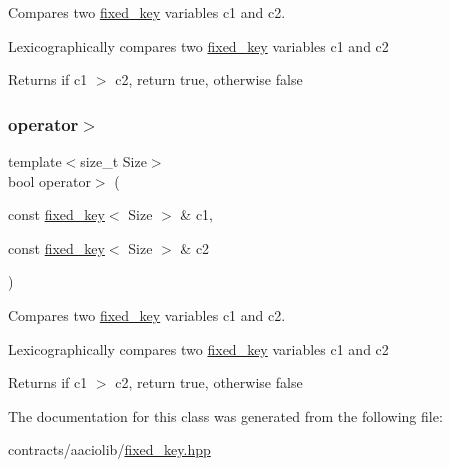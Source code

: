 Compares two \mbox{\hyperlink{classaacio_1_1fixed__key}{fixed\+\_\+key}} variables c1 and c2. 

Lexicographically compares two \mbox{\hyperlink{classaacio_1_1fixed__key}{fixed\+\_\+key}} variables c1 and c2 \begin{DoxyReturn}{Returns}
if c1 $>$ c2, return true, otherwise false 
\end{DoxyReturn}
\mbox{\label{classaacio_1_1fixed__key_a0d80d7fcf875276760867c2be8b66438}} 
\subsubsection{\texorpdfstring{operator$>$}{operator>}\hspace{0.1cm}{\footnotesize\ttfamily [2/2]}}
{\footnotesize\ttfamily template$<$size\+\_\+t Size$>$ \\
bool operator$>$ (\begin{DoxyParamCaption}\item[{const \mbox{\hyperlink{classaacio_1_1fixed__key}{fixed\+\_\+key}}$<$ Size $>$ \&}]{c1,  }\item[{const \mbox{\hyperlink{classaacio_1_1fixed__key}{fixed\+\_\+key}}$<$ Size $>$ \&}]{c2 }\end{DoxyParamCaption})\hspace{0.3cm}{\ttfamily [friend]}}



Compares two \mbox{\hyperlink{classaacio_1_1fixed__key}{fixed\+\_\+key}} variables c1 and c2. 

Lexicographically compares two \mbox{\hyperlink{classaacio_1_1fixed__key}{fixed\+\_\+key}} variables c1 and c2 \begin{DoxyReturn}{Returns}
if c1 $>$ c2, return true, otherwise false 
\end{DoxyReturn}


The documentation for this class was generated from the following file\+:\begin{DoxyCompactItemize}
\item 
contracts/aaciolib/\mbox{\hyperlink{contracts_2aaciolib_2fixed__key_8hpp}{fixed\+\_\+key.\+hpp}}\end{DoxyCompactItemize}
